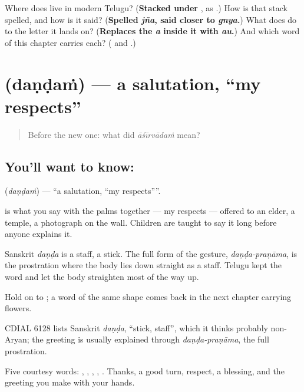 \begin{tcolorbox}[breakable,colback=teal!4,colframe=teal!35!black,title={Before you move on}]
Where does  live in modern Telugu? (\textbf{Stacked under }, as .) How is that stack spelled, and how is it said? (\textbf{Spelled \emph{jña}, said closer to \emph{gnya}.}) What does  do to the letter it lands on? (\textbf{Replaces the \emph{a} inside it with \emph{au}.}) And which word of this chapter carries each? (\textbf{} and \textbf{}.)
\end{tcolorbox}
\section[\texorpdfstring{\te{దండం} (daṇḍaṁ)}{దండం (daṇḍaṁ)}]{ (daṇḍaṁ) — a salutation, \textquotedblleft{}my respects\textquotedblright{}}

\label{lesson:TE-C51-salutation}



\begin{quote}
Before the new one: what did \emph{āśīrvādaṁ} mean?
\end{quote}

\subsection*{You'll want to know: }
\textbf{} (\emph{daṇḍaṁ}) — \textquotedblleft{}a salutation, \textquotedblleft{}my respects\textquotedblright{}\textquotedblright{}.

 is what you say with the palms together --- my respects --- offered to an elder, a temple, a photograph on the wall. Children are taught to say it long before anyone explains it.

Sanskrit \emph{daṇḍa} is a staff, a stick. The full form of the gesture, \emph{daṇḍa-praṇāma}, is the prostration where the body lies down straight as a staff. Telugu kept the word and let the body straighten most of the way up.

Hold on to ; a word of the same shape comes back in the next chapter carrying flowers.

CDIAL 6128 lists Sanskrit \emph{daṇḍa}, \textquotedblleft{}stick, staff\textquotedblright{}, which it thinks probably non-Aryan; the greeting is usually explained through \emph{daṇḍa-praṇāma}, the full prostration.

\begin{grammarlens}[title={What you've built}]
Five courtesy words: , , , , . Thanks, a good turn, respect, a blessing, and the greeting you make with your hands.
\end{grammarlens}

